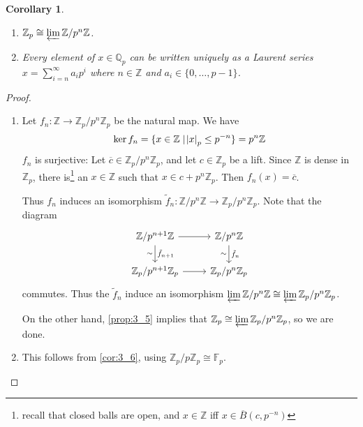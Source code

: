 \documentclass[11pt]{article}
\theoremstyle{definition}
\theoremstyle{plain}
\newtheorem{corollary}[definition]{Corollary}
\theoremstyle{remark}
\newcommand{\FF}{\mathbb{F}}
\newcommand{\ZZ}{\mathbb{Z}}
\newcommand{\QQ}{\mathbb{Q}}
\begin{document}
\begin{corollary}\label{cor:3_7}\phantom{}
    \begin{enumerate}
        \item $\ZZ_p \cong \varprojlim \ZZ / p^n \ZZ$.
        \item Every element of $x \in \QQ_p$ can be written uniquely as a Laurent series $x = \sum_{i=n}^\infty a_i p^i$ where $n \in \ZZ$ and $a_i \in \{0, \ldots, p - 1\}$.
    \end{enumerate}
\end{corollary}
\begin{proof}\phantom{}
    \begin{enumerate}
        \item Let $f_n : \ZZ \to \ZZ_p / p^n \ZZ_p$ be the natural map. We have
            \begin{equation*}
                \ker{f_n} = \{x \in \ZZ \mid \abs{x}_p \le p^{-n}\} = p^n \ZZ
            \end{equation*}
            $f_n$ is surjective: Let $\overline{c} \in \ZZ_p / p^n \ZZ_p$, and let $c \in \ZZ_p$ be a lift. Since $\ZZ$ is dense in $\ZZ_p$, there is\footnote{recall that closed balls are open, and $x \in \ZZ$ iff $x \in \overline{B}(c, p^{-n})$} an $x \in \ZZ$ such that $x \in c + p^n \ZZ_p$. Then $f_n(x) = \overline{c}$.

            Thus $f_n$ induces an isomorphism $\tilde{f}_n : \ZZ / p^n \ZZ \to \ZZ_p / p^n \ZZ_p$. Note that the diagram
            \begin{equation*}
            \begin{tikzcd}
                \ZZ/p^{n+1} \ZZ \arrow[r]\arrow[d, "\tilde{f}_{n+1}", "\sim"'] & \ZZ/p^n \ZZ \arrow[d, "\tilde{f}_n", "\sim"']\\
                \ZZ_p/p^{n+1} \ZZ_p \arrow[r] & \ZZ_p/p^n \ZZ_p
            \end{tikzcd}
            \end{equation*}
            commutes. Thus the $\tilde{f}_n$ induce an isomorphism $\varprojlim \ZZ/p^n\ZZ \cong \varprojlim \ZZ_p/p^n\ZZ_p$.

            On the other hand, \autoref{prop:3_5} implies that $\ZZ_p \cong \varprojlim \ZZ_p / p^n \ZZ_p$, so we are done.

        \item This follows from \autoref{cor:3_6}, using $\ZZ_p / p \ZZ_p \cong \FF_p$.\qedhere
    \end{enumerate}
\end{proof}
\end{document}
